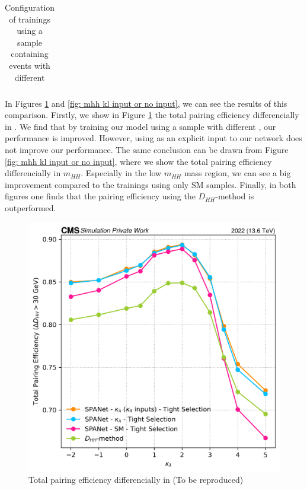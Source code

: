 \begin{table}[h!]
\begin{tabular}{|M{4cm}|M{7cm}|}
    
     \hline
    \end{tabular}
    \caption{Configuration of trainings using a sample containing events with different \kl}
    \label{table:kl as input or not}
\end{table}

In Figures \ref{fig: kl kl input or no input} and \ref{fig: mhh kl input or no input}, we can see the results of this comparison. Firstly, we show in Figure \ref{fig: kl kl input or no input} the total pairing efficiency differencially in \kl.
We find that by training our model using a sample with different \kl, our performance is improved. However, using \kl as an explicit input to our network does not improve our performance. The same conclusion can be drawn from Figure \ref{fig: mhh kl input or no input}, where we show the total pairing efficiency differencially in $m_{HH}$. Especially in the low $m_{HH}$ mass region, we can see a big improvement compared to the trainings using only SM samples. Finally, in both figures one finds that the pairing efficiency using the $D_{HH}$-method is outperformed.

\begin{figure}[hbt]
    \centering
    \includegraphics[width=0.6\linewidth]{Images/6.Improving/kappa lambda/kl inout vs no input.png}
    \caption{Total pairing efficiency differencially in \kl (To be reproduced)}
    \label{fig: kl kl input or no input}
\end{figure}

